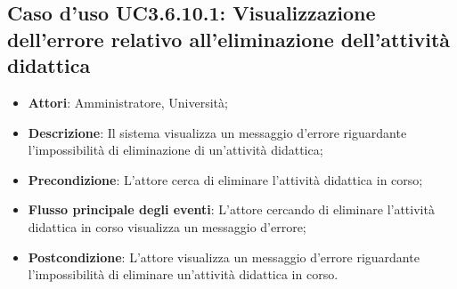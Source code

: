 \subsection{Caso d'uso \texorpdfstring{UC3.6.10.1}{UC3.6.10.1}: Visualizzazione dell'errore relativo all'eliminazione dell’attività didattica}
\begin{itemize}
\item \textbf{Attori}: Amministratore, Università;
\item \textbf{Descrizione}: Il sistema visualizza un messaggio d'errore riguardante l'impossibilità di eliminazione di un'attività didattica;

\item \textbf{Precondizione}: L'attore cerca di eliminare l'attività didattica in corso;

\item \textbf{Flusso principale degli eventi}: L'attore cercando di eliminare l'attività didattica in corso visualizza un messaggio d'errore;

\item \textbf{Postcondizione}: L'attore visualizza un messaggio d'errore riguardante l'impossibilità di eliminare un'attività didattica in corso.

\end{itemize}
